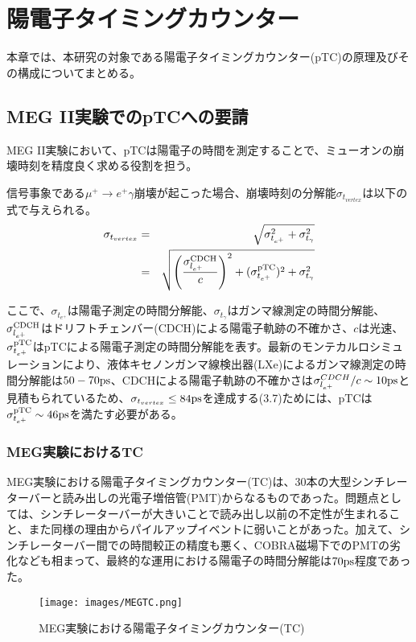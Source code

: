 \documentclass[Yonemoto_master.tex]{subfiles}
\begin{document}
\chapter{陽電子タイミングカウンター}
本章では、本研究の対象である陽電子タイミングカウンター(pTC)の原理及びその構成についてまとめる。
\section{MEG II実験でのpTCへの要請}

MEG II実験において、pTCは陽電子の時間を測定することで、ミューオンの崩壊時刻を精度良く求める役割を担う。

信号事象である$\mu^+ \to e^+\gamma$崩壊が起こった場合、崩壊時刻の分解能$\sigma_{t_{vertex}}$は以下の式で与えられる。 \\

\begin{eqnarray}
\sigma_{t_{vertex}} & = & \sqrt{\sigma_{t_{e^+}}^2 + \sigma_{t_{\gamma}}^2} \nonumber \\ 
& = & \sqrt{\left( \frac{\sigma_{l_{e^+}}^{\rm CDCH}}{c} \right)^2 + (\sigma_{t_{e^+}}^{\rm pTC})^2 + \sigma_{t_{\gamma}}^2}
\end{eqnarray}

ここで、$\sigma_{t_{e^+}}$は陽電子測定の時間分解能、$\sigma_{t_{\gamma}}$はガンマ線測定の時間分解能、$\sigma_{l_{e^+}}^{\rm CDCH}$はドリフトチェンバー(CDCH)による陽電子軌跡の不確かさ、$c$は光速、$\sigma_{t_{e^+}}^{\rm pTC}$はpTCによる陽電子測定の時間分解能を表す。最新のモンテカルロシミュレーションにより、液体キセノンガンマ線検出器(LXe)によるガンマ線測定の時間分解能は$50-70 \rm ps$、CDCHによる陽電子軌跡の不確かさは$\sigma_{l_{e^+}}^{CDCH}/c \sim 10 \rm ps$と見積もられているため、$\sigma_{t_{vertex}} \le 84 \rm ps$を達成する(3.7)ためには、pTCは$\sigma_{t_{e^+}}^{\rm pTC} \sim 46 \rm ps$を満たす必要がある。

\subsection{MEG実験におけるTC}
MEG実験における陽電子タイミングカウンター(TC)は、30本の大型シンチレーターバーと読み出しの光電子増倍管(PMT)からなるものであった。問題点としては、シンチレーターバーが大きいことで読み出し以前の不定性が生まれること、また同様の理由からパイルアップイベントに弱いことがあった。加えて、シンチレーターバー間での時間較正の精度も悪く、COBRA磁場下でのPMTの劣化なども相まって、最終的な運用における陽電子の時間分解能は$70 \rm ps$程度であった。

\begin{figure}[h]
\begin{center}
\texttt{[image: images/MEGTC.png]}
\caption{MEG実験における陽電子タイミングカウンター(TC)}
\end{center}
\end{figure}
\end{document}
